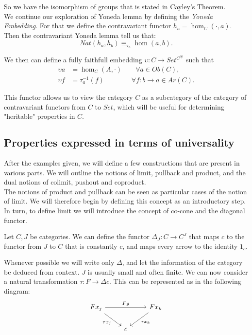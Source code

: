So we have the isomorphism of groups that is stated in Cayley's Theorem.\\



We continue our exploration of Yoneda lemma by defining the \emph{Yoneda Embedding}. For that we define the contravariant functor $h_a = \hom_C(\cdot, a)$. Then the contravariant Yoneda lemma tell us that:
$$Nat(h_a,h_b) \equiv_{\tau_a} \hom(a,b).$$

We then can define a fully faithfull embedding $\upsilon: C \to Set^{C^{op}}$ such that 
\begin{align*}
  \upsilon a  &= \hom_C(A, \cdot)\qquad \forall a \in Ob(C), \\
  \upsilon f &= \tau_a^{-1} (f)\qquad\qquad \forall f:b\to a\in Ar(C).
\end{align*}

This functor allows us to view the category $C$ as a subcategory of the category of contravariant functors from $C$ to $Set$, which will be useful for determining "heritable" properties in $C$.
\subsection{Properties expressed in terms of universality}

  After the examples given, we will define a few constructions that are present in various parts. We will outline the notions of limit, pullback and product, and the dual notions of colimit, pushout and coproduct.\\

  The notions of product and pullback can be seen as particular cases of the notion of limit. We will therefore begin by defining this concept as an introductory step. In turn, to define limit we will introduce the concept of co-cone and the diagonal functor. \\

  \begin{definition}
    Let $C,J$ be categories. We can define the functor $\Delta_J: C \to C^J$ that maps $c$ to the functor from $J$ to $C$ that is constantly $c$, and maps every arrow to the identity $1_c$. 
  \end{definition}

  Whenever possible we will write only $\Delta$, and let the information of the category be deduced from context. $J$ is usually small and often finite. We can now consider a natural transformation $\tau: F \to \Delta c$. This can be represented as in the following diagram:
    \[
      \begin{tikzcd}
        Fx_j\arrow[swap]{dr}{\tau x_j}\arrow{rr}{F g} &
        & Fx_k\arrow{dl}{\tau x_k}\\
        & c&
      \end{tikzcd}
    \]

